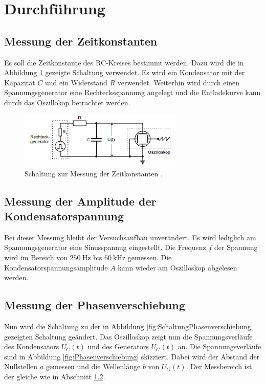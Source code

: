 \section{Durchführung}
\label{sec:Durchfuehrung}

\subsection{Messung der Zeitkonstanten}
\label{sec:BestimmungderZeitkonstanten}
Es soll die Zeitkonstante des RC-Kreises bestimmt werden. Dazu wird die in Abbildung \ref{fig:Zeitkonstante} 
gezeigte Schaltung verwendet. Es wird ein Kondensator mit der Kapazität $C$ und ein Widerstand $R$ verwendet.
Weiterhin wird durch einen Spannungsgenerator eine Rechtecksspannung angelegt und
die Entladekurve kann durch das Oszillokop betrachtet werden.
\begin{figure}
    \centering
    \includegraphics[width=0.7\textwidth]{Zeitkonstante.png}
    \caption{Schaltung zur Messung der Zeitkonstanten \cite{sample}.}
    \label{fig:Zeitkonstante}
\end{figure}

\subsection{Messung der Amplitude der Kondensatorspannung}
\label{sec:AmplitudeKondensatorspannung}
Bei dieser Messung bleibt der Versuchsaufbau unverändert. Es wird lediglich am Spannungsgenerator eine Sinusspannug
eingestellt. Die Frequenz $f$ der Spannung wird im Bereich von $\SI{250}{\hertz}$ bis $\SI{60}{\kilo\hertz}$
gemessen. Die Kondensatorspannungsamplitude $A$ kann wieder am Oszilloskop abgelesen werden.

\subsection{Messung der Phasenverschiebung}
\label{sec:Phasenverschiebung}
Nun wird die Schaltung zu der in Abbildung \ref{fig:SchaltungPhasenverschiebung} gezeigten Schaltung
geändert. Das Oszilloskop zeigt nun die Spannungsverläufe des Kondensators $U_{C}(t)$ und des Generators
$U_{G}(t)$ an. Die Spannungsverläufe sind in Abbildung \ref{fig:Phasenverschiebung} skizziert. Dabei wird
der Abstand der Nullstellen $a$ gemessen und die Wellenlänge $b$ von $U_{G}(t)$. Der Messbereich ist der 
gleiche wie in Abschnitt \ref{sec:AmplitudeKondensatorspannung}.

